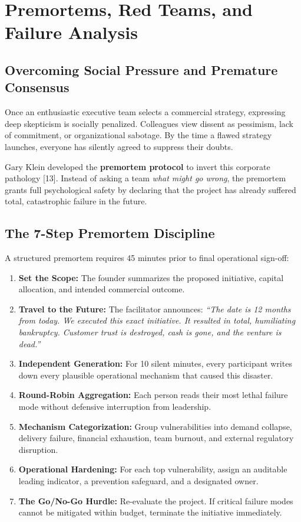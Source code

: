 \section{Premortems, Red Teams, and Failure Analysis}

\subsection{Overcoming Social Pressure and Premature Consensus}

Once an enthusiastic executive team selects a commercial strategy, expressing deep skepticism is socially penalized. Colleagues view dissent as pessimism, lack of commitment, or organizational sabotage. By the time a flawed strategy launches, everyone has silently agreed to suppress their doubts.

Gary Klein developed the \textbf{premortem protocol} to invert this corporate pathology [13]. Instead of asking a team \textit{what might go wrong}, the premortem grants full psychological safety by declaring that the project has already suffered total, catastrophic failure in the future.

\subsection{The 7-Step Premortem Discipline}

A structured premortem requires 45 minutes prior to final operational sign-off:
\begin{enumerate}[leftmargin=12pt,itemsep=2pt,topsep=1pt,parsep=0pt]
  \item \textbf{Set the Scope:} The founder summarizes the proposed initiative, capital allocation, and intended commercial outcome.
  \item \textbf{Travel to the Future:} The facilitator announces: \textit{``The date is 12 months from today. We executed this exact initiative. It resulted in total, humiliating bankruptcy. Customer trust is destroyed, cash is gone, and the venture is dead.''}
  \item \textbf{Independent Generation:} For 10 silent minutes, every participant writes down every plausible operational mechanism that caused this disaster.
  \item \textbf{Round-Robin Aggregation:} Each person reads their most lethal failure mode without defensive interruption from leadership.
  \item \textbf{Mechanism Categorization:} Group vulnerabilities into demand collapse, delivery failure, financial exhaustion, team burnout, and external regulatory disruption.
  \item \textbf{Operational Hardening:} For each top vulnerability, assign an auditable leading indicator, a prevention safeguard, and a designated owner.
  \item \textbf{The Go/No-Go Hurdle:} Re-evaluate the project. If critical failure modes cannot be mitigated within budget, terminate the initiative immediately.
\end{enumerate}

